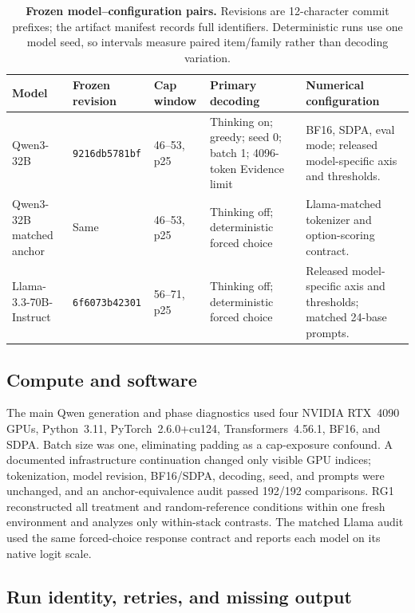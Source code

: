 \documentclass[letterpaper]{article}
\begin{document}
\begin{table}[t]
\centering
\scriptsize
\setlength{\tabcolsep}{3pt}
\renewcommand{\arraystretch}{1.12}
\begin{tabularx}{\textwidth}{@{}L{2.25cm}L{2.15cm}L{1.75cm}L{3.15cm}Y@{}}
\toprule
Model & Frozen revision & Cap window & Primary decoding & Numerical configuration \\
\midrule
Qwen3-32B & \texttt{9216db5781bf} & 46--53, p25 & Thinking on; greedy; seed 0; batch 1; 4096-token Evidence limit & BF16, SDPA, eval mode; released model-specific axis and thresholds. \\
Qwen3-32B matched anchor & Same & 46--53, p25 & Thinking off; deterministic forced choice & Llama-matched tokenizer and option-scoring contract. \\
Llama-3.3-70B-Instruct & \texttt{6f6073b42301} & 56--71, p25 & Thinking off; deterministic forced choice & Released model-specific axis and thresholds; matched 24-base prompts. \\
\bottomrule
\end{tabularx}
\caption{\textbf{Frozen model--configuration pairs.} Revisions are 12-character commit prefixes; the artifact manifest records full identifiers. Deterministic runs use one model seed, so intervals measure paired item/family rather than decoding variation.}
\label{tab:supp-models}
\end{table}

\subsection{Compute and software}

The main Qwen generation and phase diagnostics used four NVIDIA RTX~4090 GPUs, Python~3.11, PyTorch~2.6.0+cu124, Transformers~4.56.1, BF16, and SDPA.  Batch size was one, eliminating padding as a cap-exposure confound.  A documented infrastructure continuation changed only visible GPU indices; tokenization, model revision, BF16/SDPA, decoding, seed, and prompts were unchanged, and an anchor-equivalence audit passed 192/192 comparisons.  RG1 reconstructed all treatment and random-reference conditions within one fresh environment and analyzes only within-stack contrasts.  The matched Llama audit used the same forced-choice response contract and reports each model on its native logit scale.

\subsection{Run identity, retries, and missing output}
\end{document}
